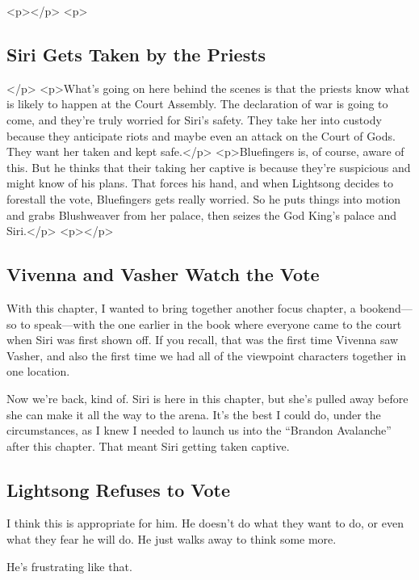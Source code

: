 <p></p>
<p>\subsection*{Siri Gets Taken by the Priests}</p>
<p>What’s going on here behind the scenes is that the priests know what is likely to happen at the Court Assembly. The declaration of war is going to come, and they’re truly worried for Siri’s safety. They take her into custody because they anticipate riots and maybe even an attack on the Court of Gods. They want her taken and kept safe.</p>
<p>Bluefingers is, of course, aware of this. But he thinks that their taking her captive is because they’re suspicious and might know of his plans. That forces his hand, and when Lightsong decides to forestall the vote, Bluefingers gets really worried. So he puts things into motion and grabs Blushweaver from her palace, then seizes the God King’s palace and Siri.</p>
<p></p>

\subsection*{Vivenna and Vasher Watch the Vote}

With this chapter, I wanted to bring together another focus chapter, a bookend—so to speak—with the one earlier in the book where everyone came to the court when Siri was first shown off. If you recall, that was the first time Vivenna saw Vasher, and also the first time we had all of the viewpoint characters together in one location.

Now we’re back, kind of. Siri is here in this chapter, but she’s pulled away before she can make it all the way to the arena. It’s the best I could do, under the circumstances, as I knew I needed to launch us into the “Brandon Avalanche” after this chapter. That meant Siri getting taken captive.

\subsection*{Lightsong Refuses to Vote}

I think this is appropriate for him. He doesn’t do what they want to do, or even what they fear he will do. He just walks away to think some more.

He’s frustrating like that.



